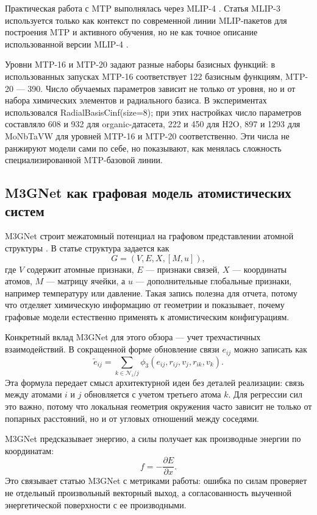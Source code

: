 Практическая работа с MTP выполнялась через MLIP-4 \cite{mlip4software}. Статья MLIP-3 используется только как контекст по современной линии MLIP-пакетов для построения MTP и активного обучения, но не как точное описание использованной версии MLIP-4 \cite{podryabinkin2023mlip3}.

Уровни MTP-16 и MTP-20 задают разные наборы базисных функций: в использованных запусках MTP-16 соответствует 122 базисным функциям, MTP-20 — 390. Число обучаемых параметров зависит не только от уровня, но и от набора химических элементов и радиального базиса. В экспериментах использовался RadialBasisCinf(size=8); при этих настройках число параметров составляло 608 и 932 для organic-датасета, 222 и 450 для H2O, 897 и 1293 для MoNbTaVW для уровней MTP-16 и MTP-20 соответственно. Эти числа не ранжируют модели сами по себе, но показывают, как менялась сложность специализированной MTP-базовой линии.

\subsection{M3GNet как графовая модель атомистических систем}

M3GNet строит межатомный потенциал на графовом представлении атомной структуры \cite{m3gnet2022}. В статье структура задается как
\[
    G = (V, E, X, [M, u]),
\]
где \(V\) содержит атомные признаки, \(E\) — признаки связей, \(X\) — координаты атомов, \(M\) — матрицу ячейки, а \(u\) — дополнительные глобальные признаки, например температуру или давление. Такая запись полезна для отчета, потому что отделяет химическую информацию от геометрии и показывает, почему графовые модели естественно применять к атомистическим конфигурациям.

Конкретный вклад M3GNet для этого обзора — учет трехчастичных взаимодействий. В сокращенной форме обновление связи \(e_{ij}\) можно записать как
\[
    \widetilde{e}_{ij}
    =
    \sum_{k \in \mathcal{N}_i / j}
    \phi_3(e_{ij}, r_{ij}, v_j, r_{ik}, v_k).
    \label{eq:m3gnet_three_body_short}
\]
Эта формула передает смысл архитектурной идеи без деталей реализации: связь между атомами \(i\) и \(j\) обновляется с учетом третьего атома \(k\). Для регрессии сил это важно, потому что локальная геометрия окружения часто зависит не только от попарных расстояний, но и от угловых отношений между соседями.

M3GNet предсказывает энергию, а силы получает как производные энергии по координатам:
\[
    f
    =
    -\frac{\partial E}{\partial x}.
    \label{eq:m3gnet_forces_short}
\]
Это связывает статью M3GNet с метриками работы: ошибка по силам проверяет не отдельный произвольный векторный выход, а согласованность выученной энергетической поверхности с ее производными.

